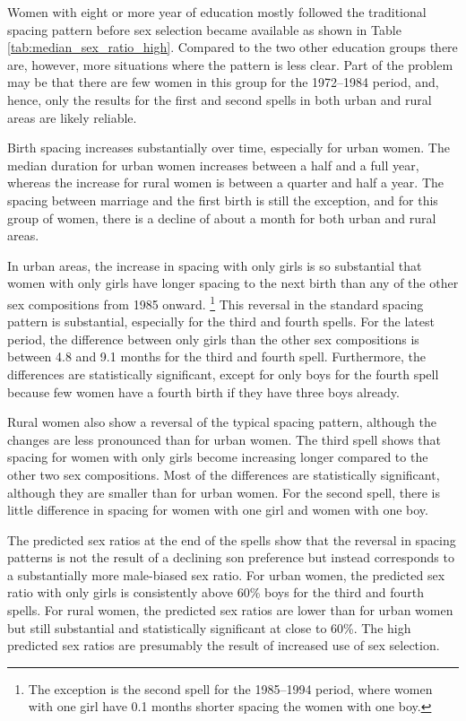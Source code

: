 \documentclass[12pt,letterpaper]{article}
\begin{document}


Women with eight or more year of education mostly followed 
the traditional spacing pattern before sex selection became 
available as shown in Table \ref{tab:median_sex_ratio_high}.
Compared to the two other education groups there are,
however, more situations where the pattern is less clear.
Part of the problem may be that there are few women in
this group for the 1972--1984 period, and, hence, only 
the results for the first and second spells in both urban 
and rural areas are likely reliable.


Birth spacing increases substantially over time, 
especially for urban women. 
The median duration for urban women increases between a half
and a full year, whereas the increase for rural women 
is between a quarter and half a year.
The spacing between marriage and the first birth is still the
exception, and for this group of women, there is a decline of
about a month for both urban and rural areas.


In urban areas, the increase in spacing with only girls is so 
substantial that women with only girls have longer spacing to the 
next birth than any of the other sex compositions from 1985 onward.%
\footnote{
The exception is the second spell for the 1985--1994 period, where women
with one girl have 0.1 months shorter spacing the women with one boy.
}
This reversal in the standard spacing pattern is substantial, 
especially for the third and fourth spells.
For the latest period, the difference between only girls than the
other sex compositions is between 4.8 and 9.1 months for the third
and fourth spell.
Furthermore, the differences are statistically significant, except
for only boys for the fourth spell because few women have a fourth
birth if they have three boys already.


Rural women also show a reversal of the typical spacing pattern,
although the changes are less pronounced than for urban women.
The third spell shows that spacing for women with only girls become
increasing longer compared to the other two sex compositions.
Most of the differences are statistically significant, although they are 
smaller than for urban women.
For the second spell, there is little difference in spacing for
women with one girl and women with one boy.

The predicted sex ratios at the end of the spells show that
the reversal in spacing patterns is not the result of a declining son
preference but instead corresponds to a substantially more male-biased 
sex ratio.
For urban women, the predicted sex ratio with only girls 
is consistently above 60\% boys for the third and fourth spells.
For rural women, the predicted sex ratios are lower than for urban
women but still substantial and statistically significant at close 
to 60\%.
The high predicted sex ratios are presumably the result of increased 
use of sex selection.
\end{document}
